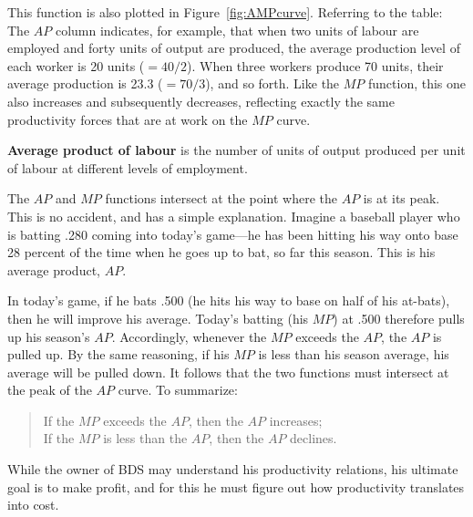 This function is also plotted in Figure~\ref{fig:AMPcurve}. Referring to the
table: The $AP$ column indicates, for example, that when two units of labour
are employed and forty units of output are produced, the average production
level of each worker is 20 units ($=40/2$). When three workers produce 70
units, their average production is 23.3 ($=70/3$), and so forth. Like the $MP$
function, this one also increases and subsequently decreases, reflecting
exactly the same productivity forces that are at work on the $MP$ curve.

\begin{DefBox}
	\textbf{Average product of labour} is the number of units of output produced per unit of labour at different levels of employment.
\end{DefBox}

\newhtmlpage

The $AP$ and $MP$ functions intersect at the point where the $AP$ is at its
peak. This is no accident, and has a simple explanation. Imagine a baseball
player who is batting .280 coming into today's game---he has been hitting
his way onto base 28 percent of the time when he goes up to bat, so far this
season. This is his average product, $AP$.

In today's game, if he bats .500 (he hits his way to base on half of his
at-bats), then he will improve his average. Today's batting (his $MP$) at
.500 therefore pulls up his season's $AP$. Accordingly, whenever the $MP$
exceeds the $AP$, the $AP$ is pulled up. By the same reasoning, if his $MP$
is less than his season average, his average will be pulled down. It follows
that the two functions must intersect at the peak of the $AP$ curve. To
summarize:

\begin{quote}
	If the $MP$ exceeds the $AP$, then the $AP$ increases; \\
	If the $MP$ is less than the $AP$, then the $AP$ declines.
\end{quote}

While the owner of BDS may understand his productivity relations, his
ultimate goal is to make profit, and for this he must figure out how
productivity translates into cost.

